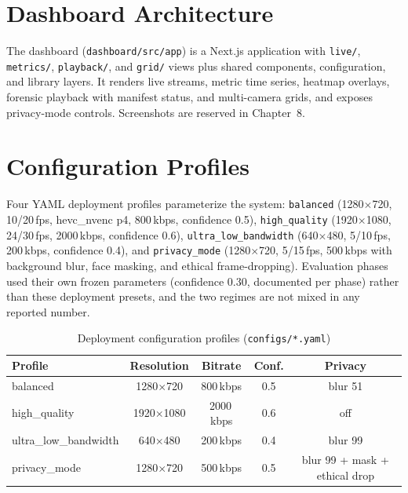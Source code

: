 \section{Dashboard Architecture}

The dashboard (\texttt{dashboard/src/app}) is a Next.js application with \texttt{live/}, \texttt{metrics/}, \texttt{playback/}, and \texttt{grid/} views plus shared components, configuration, and library layers. It renders live streams, metric time series, heatmap overlays, forensic playback with manifest status, and multi-camera grids, and exposes privacy-mode controls. Screenshots are reserved in Chapter~8.

\section{Configuration Profiles}

Four YAML deployment profiles parameterize the system: \texttt{balanced} (1280$\times$720, 10/20\,fps, hevc\_nvenc p4, 800\,kbps, confidence 0.5), \texttt{high\_quality} (1920$\times$1080, 24/30\,fps, 2000\,kbps, confidence 0.6), \texttt{ultra\_low\_bandwidth} (640$\times$480, 5/10\,fps, 200\,kbps, confidence 0.4), and \texttt{privacy\_mode} (1280$\times$720, 5/15\,fps, 500\,kbps with background blur, face masking, and ethical frame-dropping). Evaluation phases used their own frozen parameters (confidence 0.30, documented per phase) rather than these deployment presets, and the two regimes are not mixed in any reported number.

\begin{table}[H]
\centering
\caption{Deployment configuration profiles (\texttt{configs/*.yaml})}
\label{tab:profiles}
\begin{tabular}{|l|c|c|c|c|}
\hline
\textbf{Profile} & \textbf{Resolution} & \textbf{Bitrate} & \textbf{Conf.} & \textbf{Privacy} \\
\hline
balanced & 1280$\times$720 & 800\,kbps & 0.5 & blur 51 \\
high\_quality & 1920$\times$1080 & 2000\,kbps & 0.6 & off \\
ultra\_low\_bandwidth & 640$\times$480 & 200\,kbps & 0.4 & blur 99 \\
privacy\_mode & 1280$\times$720 & 500\,kbps & 0.5 & blur 99 + mask + ethical drop \\
\hline
\end{tabular}
\end{table}
